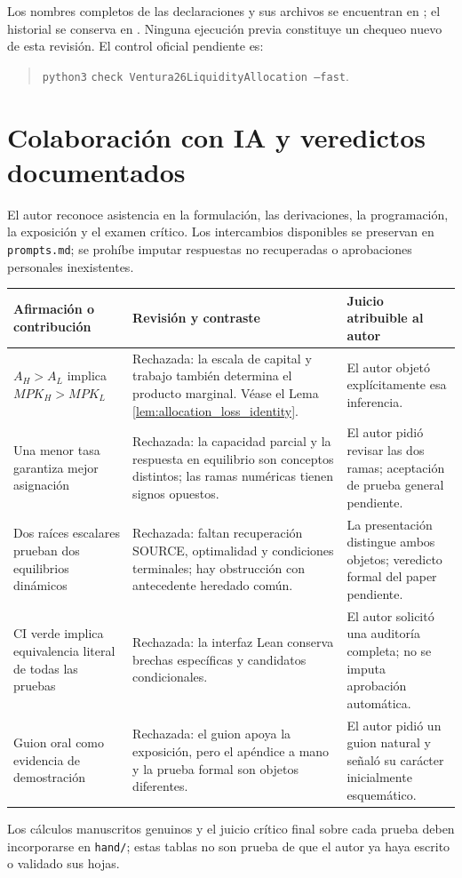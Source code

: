 \endgroup
Los nombres completos de las declaraciones y sus archivos se
encuentran en ; el
historial se conserva en .
Ninguna ejecución previa constituye un chequeo nuevo de esta
revisión. El control oficial pendiente es:
\begin{quote}\small
\texttt{python3} 
\texttt{check Ventura26LiquidityAllocation --fast}.
\end{quote}

\section{Colaboración con IA y veredictos documentados}
\label{app:compact_ai_log}
El autor reconoce asistencia en la formulación, las
derivaciones, la programación, la exposición y el examen
crítico. Los intercambios disponibles se preservan
en \texttt{prompts.md}; se prohíbe imputar respuestas
no recuperadas o aprobaciones personales inexistentes.
\begin{longtable}{@{}p{4.8cm}p{6.0cm}p{3.35cm}@{}}
\toprule
Afirmación o contribución & Revisión y contraste & Juicio atribuible al autor\\\midrule\endhead
$A_H>A_L$ implica $MPK_H>MPK_L$ &
Rechazada: la escala de capital y trabajo también
determina el producto marginal. Véase el Lema
\ref{lem:allocation_loss_identity}. &
El autor objetó explícitamente esa inferencia.\\
Una menor tasa garantiza mejor asignación &
Rechazada: la capacidad parcial y la respuesta
en equilibrio son conceptos distintos; las ramas
numéricas tienen signos opuestos. &
El autor pidió revisar las dos ramas; aceptación
de prueba general pendiente.\\
Dos raíces escalares prueban dos equilibrios dinámicos &
Rechazada: faltan recuperación SOURCE, optimalidad
y condiciones terminales; hay obstrucción con
antecedente heredado común. &
La presentación distingue ambos objetos;
veredicto formal del paper pendiente.\\
CI verde implica equivalencia literal de todas las pruebas &
Rechazada: la interfaz Lean conserva brechas
específicas y candidatos condicionales. &
El autor solicitó una auditoría completa;
no se imputa aprobación automática.\\
Guion oral como evidencia de demostración &
Rechazada: el guion apoya la exposición, pero
el apéndice a mano y la prueba formal son objetos
diferentes. &
El autor pidió un guion natural y señaló su
carácter inicialmente esquemático.\\
\bottomrule
\end{longtable}
Los cálculos manuscritos genuinos y el juicio crítico
final sobre cada prueba deben incorporarse en
\texttt{hand/}; estas tablas no son prueba de que
el autor ya haya escrito o validado sus hojas.


